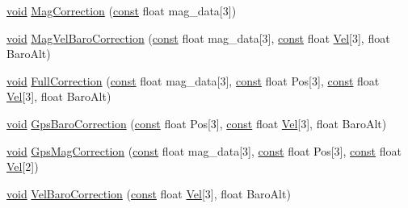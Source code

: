 \begin{DoxyCompactItemize}
\item 
\hyperlink{group___n_a_m_e_ga18028b8badbf1ea7e704ccac3c488e82}{void} \hyperlink{group___i_n_s_g_p_s_ga2b676563f0f8b93d971159b5b9320a5d}{Mag\-Correction} (\hyperlink{group___n_a_m_e_ga7ae6d0e43244213b34de2c2b9aa30da6}{const} float mag\-\_\-data\mbox{[}3\mbox{]})
\item 
\hyperlink{group___n_a_m_e_ga18028b8badbf1ea7e704ccac3c488e82}{void} \hyperlink{group___i_n_s_g_p_s_ga2d37f6670dad8a68c1c96282f02f208a}{Mag\-Vel\-Baro\-Correction} (\hyperlink{group___n_a_m_e_ga7ae6d0e43244213b34de2c2b9aa30da6}{const} float mag\-\_\-data\mbox{[}3\mbox{]}, \hyperlink{group___n_a_m_e_ga7ae6d0e43244213b34de2c2b9aa30da6}{const} float \hyperlink{pios__opahrs__proto_8h_a887ce86476d7dc3193741e1e01fd2652}{Vel}\mbox{[}3\mbox{]}, float Baro\-Alt)
\item 
\hyperlink{group___n_a_m_e_ga18028b8badbf1ea7e704ccac3c488e82}{void} \hyperlink{group___i_n_s_g_p_s_gac4dc3ac7ec074007dd65c472a2176c54}{Full\-Correction} (\hyperlink{group___n_a_m_e_ga7ae6d0e43244213b34de2c2b9aa30da6}{const} float mag\-\_\-data\mbox{[}3\mbox{]}, \hyperlink{group___n_a_m_e_ga7ae6d0e43244213b34de2c2b9aa30da6}{const} float Pos\mbox{[}3\mbox{]}, \hyperlink{group___n_a_m_e_ga7ae6d0e43244213b34de2c2b9aa30da6}{const} float \hyperlink{pios__opahrs__proto_8h_a887ce86476d7dc3193741e1e01fd2652}{Vel}\mbox{[}3\mbox{]}, float Baro\-Alt)
\item 
\hyperlink{group___n_a_m_e_ga18028b8badbf1ea7e704ccac3c488e82}{void} \hyperlink{group___i_n_s_g_p_s_ga6b469a6d3b312867b0b87c2c70c0749e}{Gps\-Baro\-Correction} (\hyperlink{group___n_a_m_e_ga7ae6d0e43244213b34de2c2b9aa30da6}{const} float Pos\mbox{[}3\mbox{]}, \hyperlink{group___n_a_m_e_ga7ae6d0e43244213b34de2c2b9aa30da6}{const} float \hyperlink{pios__opahrs__proto_8h_a887ce86476d7dc3193741e1e01fd2652}{Vel}\mbox{[}3\mbox{]}, float Baro\-Alt)
\item 
\hyperlink{group___n_a_m_e_ga18028b8badbf1ea7e704ccac3c488e82}{void} \hyperlink{group___i_n_s_g_p_s_ga7f60c28dd78eddbe08102c2d905261b8}{Gps\-Mag\-Correction} (\hyperlink{group___n_a_m_e_ga7ae6d0e43244213b34de2c2b9aa30da6}{const} float mag\-\_\-data\mbox{[}3\mbox{]}, \hyperlink{group___n_a_m_e_ga7ae6d0e43244213b34de2c2b9aa30da6}{const} float Pos\mbox{[}3\mbox{]}, \hyperlink{group___n_a_m_e_ga7ae6d0e43244213b34de2c2b9aa30da6}{const} float \hyperlink{pios__opahrs__proto_8h_a887ce86476d7dc3193741e1e01fd2652}{Vel}\mbox{[}2\mbox{]})
\item 
\hyperlink{group___n_a_m_e_ga18028b8badbf1ea7e704ccac3c488e82}{void} \hyperlink{group___i_n_s_g_p_s_ga3babc960a16e4ab48bf08da4a9153637}{Vel\-Baro\-Correction} (\hyperlink{group___n_a_m_e_ga7ae6d0e43244213b34de2c2b9aa30da6}{const} float \hyperlink{pios__opahrs__proto_8h_a887ce86476d7dc3193741e1e01fd2652}{Vel}\mbox{[}3\mbox{]}, float Baro\-Alt)

\end{DoxyCompactItemize}
